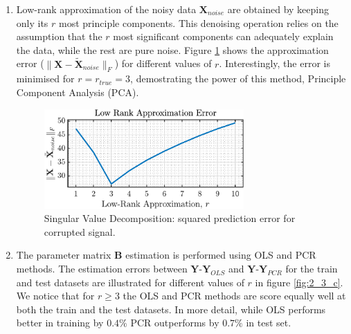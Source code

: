 \begin{enumerate}[label=\alph*), leftmargin=*]
\item
%

Low-rank approximation of the noisy data $\mathbf{X}_{noise}$ are obtained by keeping only its $r$ most principle components.
This denoising operation relies on the assumption that the $r$ most significant components can adequately explain the data,
while the rest are pure noise. Figure \ref{fig:2_3_b} shows the approximation error
($\|\mathbf{X} - \tilde{\mathbf{X}}_{noise}\|_{F}$) for different values of $r$. Interestingly, the error is minimised
for $r = r_{true} = 3$, demostrating the power of this method, Principle Component Analysis (PCA).

\begin{figure}[h]
    \centering
    \includegraphics[height=1.5in]{report/parametric-and-line-spectra/principal-component-analysis/assets/b/low-rank_X}
    \caption{Singular Value Decomposition: squared prediction error for corrupted signal.}
    \label{fig:2_3_b}
\end{figure}

\item
%

The parameter matrix $\mathbf{B}$ estimation is performed using OLS and PCR methods.
The estimation errors between $\mathbf{Y}$-$\mathbf{Y}_{OLS}$ and $\mathbf{Y}$-$\mathbf{Y}_{PCR}$ for the train and test datasets
are illustrated for different values of $r$ in figure \ref{fig:2_3_c}. We notice that for $r \geq 3$ the OLS and PCR methods
are score equally well at both the train and the test datasets. In more detail, while OLS performs better in training by $0.4\%$
PCR outperforms by $0.7\%$ in test set.


\end{enumerate}
